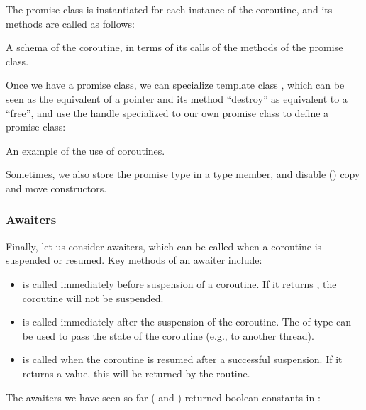 \begin{itemize}
\begin{end}
The promise class is instantiated for each instance of the coroutine, and its methods are called as follows:

\raggedbottom
\begin{codebox}[]{}
\footnotesize A schema of the coroutine, in terms of its calls of the methods of the promise class.
\tcblower
{}
\end{codebox}

Once we have a promise class, we can specialize template class , which can be seen as the equivalent of a pointer and its method ``destroy'' as equivalent to a ``free'', and use the handle specialized to our own promise class to define a promise class:

\raggedbottom
\begin{codebox}[]{\href{https://godbolt.org/z/1nYdMPh3z}{\ExternalLink}}
\footnotesize An example of the use of coroutines.
\tcblower
{}
\end{codebox}

Sometimes, we also store the promise type in a  type member, and disable () copy and move constructors. 

\subsubsection{Awaiters}

Finally, let us consider awaiters, which can be called when a coroutine is suspended or resumed. 
Key methods of an awaiter include:
\begin{itemize}
\item {} is called immediately before suspension of a coroutine. If it returns , the coroutine will not be suspended. 
\item {} is called immediately after the suspension of the coroutine. The  of type  can be used to pass the state of the coroutine (e.g., to another thread). 
\item {} is called when the coroutine is resumed after a successful suspension. If it returns a value, this will be returned by the  routine. 
\end{itemize}
The awaiters we have seen so far ( and ) returned boolean constants in :


\end{end}
\end{itemize}
